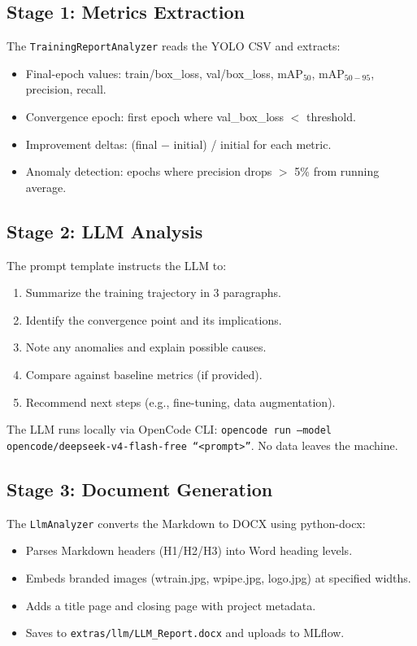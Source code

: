 \documentclass[10pt,twocolumn,letterpaper]{article}
\begin{document}
\subsection{Stage 1: Metrics Extraction}
The \texttt{TrainingReportAnalyzer} reads the YOLO CSV and extracts:
\begin{itemize}
    \item Final-epoch values: train/box\_loss, val/box\_loss, mAP$_{50}$, mAP$_{50-95}$, precision, recall.
    \item Convergence epoch: first epoch where val\_box\_loss $<$ threshold.
    \item Improvement deltas: (final $-$ initial) / initial for each metric.
    \item Anomaly detection: epochs where precision drops $>$ 5\% from running average.
\end{itemize}

\subsection{Stage 2: LLM Analysis}
The prompt template instructs the LLM to:
\begin{enumerate}
    \item Summarize the training trajectory in 3 paragraphs.
    \item Identify the convergence point and its implications.
    \item Note any anomalies and explain possible causes.
    \item Compare against baseline metrics (if provided).
    \item Recommend next steps (e.g., fine-tuning, data augmentation).
\end{enumerate}

The LLM runs locally via OpenCode CLI: \texttt{opencode run --model opencode/deepseek-v4-flash-free ``<prompt>''}. No data leaves the machine.

\subsection{Stage 3: Document Generation}
The \texttt{LlmAnalyzer} converts the Markdown to DOCX using python-docx:
\begin{itemize}
    \item Parses Markdown headers (H1/H2/H3) into Word heading levels.
    \item Embeds branded images (wtrain.jpg, wpipe.jpg, logo.jpg) at specified widths.
    \item Adds a title page and closing page with project metadata.
    \item Saves to \texttt{extras/llm/LLM\_Report.docx} and uploads to MLflow.
\end{itemize}
\end{document}

